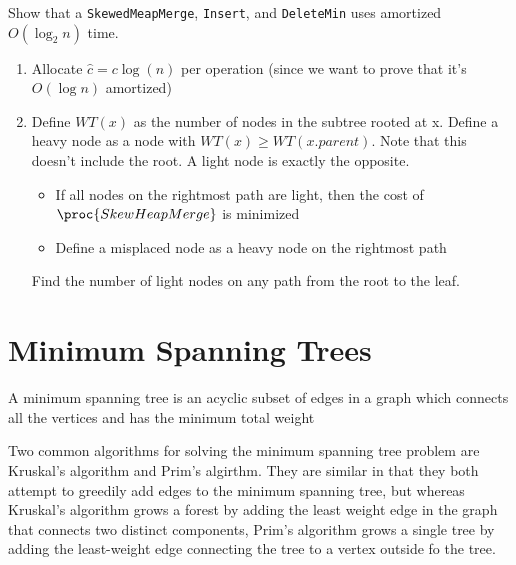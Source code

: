\documentclass[../notes.tex]{subfiles}
\begin{document}
\begin{example}
	Show that a \texttt{SkewedMeapMerge}, \texttt{Insert}, and \texttt{DeleteMin} uses amortized $ O(\log_2 n) $ time.

	\begin{enumerate}
		\item Allocate $ \hat{c}=c\log(n)$ per operation (since we want to prove that it's $ O(\log n) $ amortized)
		\item Define $ WT(x)$ as the number of nodes in the subtree rooted at x. Define a heavy node as a node with $ WT(x) \ge  WT(x.parent)$. Note that this doesn't include the root. A light node is exactly the opposite.
			\begin{itemize}
				\item If all nodes on the rightmost path are light, then the cost of $ \proc{SkewHeapMerge} $ is minimized
				\item Define a misplaced node as a heavy node on the rightmost path
			\end{itemize}

			Find the number of light nodes on any path from the root to the leaf.


	\end{enumerate}




\end{example}


\section{Minimum Spanning Trees}

\begin{definition}
	A minimum spanning tree is an acyclic subset of edges in a graph which connects all the vertices and has the minimum total weight
\end{definition}

Two common algorithms for solving the minimum spanning tree problem are Kruskal's algorithm and Prim's algirthm.
They are similar in that they both attempt to greedily add edges to the minimum spanning tree, but whereas Kruskal's algorithm grows a forest by adding the least weight edge in the graph that connects two distinct components, Prim's algorithm grows a single tree by adding the least-weight edge connecting the tree to a vertex outside fo the tree.
\end{document}
